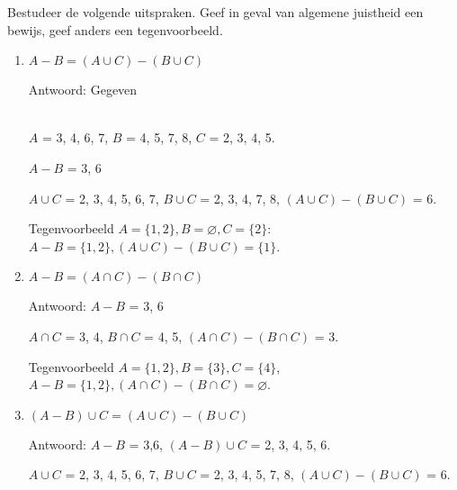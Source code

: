\begin{answer} %
Bestudeer de volgende uitspraken. Geef in geval van algemene juistheid een bewijs, geef anders een tegenvoorbeeld.
\begin{enumerate}[label=\textit{\alph*.}]
    \item $A-B=(A\cup C)-(B\cup C)$
    
    Antwoord: Gegeven\\
    \\
    $A$ = 3, 4, 6, 7, $B$ = 4, 5, 7, 8, $C$ = 2, 3, 4, 5.
    
    $A-B$ = 3, 6
    
    $A\cup C$ = 2, 3, 4, 5, 6, 7, $B\cup C$ = 2, 3, 4, 7, 8, $(A\cup C)-(B\cup C)$ = 6.
    
    Tegenvoorbeeld $A=\{1,2\}, B=\varnothing, C=\{2\}$: $A-B=\{1,2\}, (A\cup C)-(B\cup C) = \{1\}$.
    \item $A-B=(A\cap C)-(B\cap C)$
    
    Antwoord: $A-B$ = 3, 6
    
    $A\cap C$ = 3, 4, $B\cap C$ = 4, 5, $(A\cap C)-(B\cap C)$ = 3.
    
    Tegenvoorbeeld $A=\{1,2\}, B=\{3\}, C=\{4\}$, $A-B=\{1,2\}, (A\cap C)-(B\cap C)=\varnothing$.
    \item $(A-B)\cup C=(A\cup C)-(B\cup C)$
    
    Antwoord: $A-B$ = 3,6, $(A-B)\cup C$ = 2, 3, 4, 5, 6.
    
    $A\cup C$ = 2, 3, 4, 5, 6, 7, $B\cup C$ = 2, 3, 4, 5, 7, 8, $(A\cup C)-(B\cup C)$ = 6.
    

\end{enumerate}
\end{answer}
